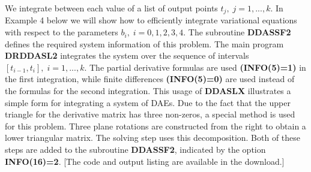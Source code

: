 \documentclass[twoside]{MATH77}
\begin{document}
We integrate between each value of a list of output points $t_{j}%
,\;j=1,...,k.$  In Example 4 below we will show how to efficiently integrate
variational equations with respect to the parameters $b_{i},\;i=0,1,2,3,4.$
The subroutine \textbf{DDASSF2} defines the required system information of
this problem.  The main program \textbf{DRDDASL2} integrates the system over
the sequence of intervals $\left[  t_{i-1},t_{i}\right]  ,\;i=1,...,k.$  The
partial derivative formulas are used \textbf{(INFO(5)=1)} in the first
integration, while finite differences \textbf{(INFO(5)=0)} are used instead
of the formulas for the second integration.  This usage of \textbf{DDASLX}
illustrates a simple form for integrating a system of DAEs.  Due to the fact that the
upper triangle for the derivative matrix has three non-zeros, a special method is used for
this  problem.  Three plane rotations are constructed from the right to obtain a lower
triangular matrix.  The solving step uses this decomposition.  Both of these steps are
added to the subroutine \textbf{DDASSF2}, indicated by the option \textbf{INFO(16)=2}.
[The code and output listing are available in the download.]
\end{document}
